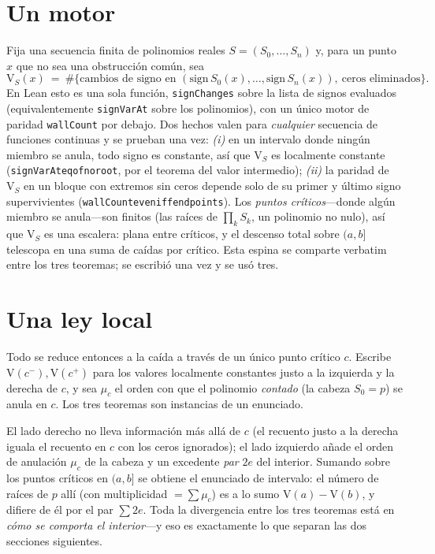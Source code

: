\documentclass[11pt]{article}
\newcommand{\lean}[1]{{\def\_{\textunderscore\allowbreak}\texttt{#1}}}
\newcommand{\V}{\mathrm{V}}
\newcommand{\keyeq}[1]{\begin{center}\keybox{$\displaystyle #1$}\end{center}}
\begin{document}
\section{Un motor}\label{sec:engine}

Fija una secuencia finita de polinomios reales $S=(S_0,\dots,S_n)$ y, para un punto $x$ que no sea una
obstrucci\'on com\'un, sea
\[
  \V_S(x)\ =\ \#\{\text{cambios de signo en } (\mathrm{sign}\,S_0(x),\dots,\mathrm{sign}\,S_n(x)),\ \text{ceros eliminados}\}.
\]
En Lean esto es una sola funci\'on, \lean{signChanges} sobre la lista de signos evaluados (equivalentemente
\lean{signVarAt} sobre los polinomios), con un \'unico motor de paridad \lean{wallCount} por debajo. Dos
hechos valen para \emph{cualquier} secuencia de funciones continuas y se prueban una vez: \emph{(i)} en un
intervalo donde ning\'un miembro se anula, todo signo es constante, as\'i que $\V_S$ es localmente constante
(\lean{signVarAt\_eq\_of\_no\_root}, por el teorema del valor intermedio); \emph{(ii)} la paridad de $\V_S$
en un bloque con extremos sin ceros depende solo de su primer y \'ultimo signo supervivientes
(\lean{wallCount\_even\_iff\_endpoints}). Los \emph{puntos cr\'iticos}---donde alg\'un miembro se anula---son
finitos (las ra\'ices de $\prod_k S_k$, un polinomio no nulo), as\'i que $\V_S$ es una escalera: plana entre
cr\'iticos, y el descenso total sobre $(a,b]$ telescopa en una suma de ca\'idas por cr\'itico. Esta espina
se comparte verbatim entre los tres teoremas; se escribi\'o una vez y se us\'o tres.

\section{Una ley local}\label{sec:law}

Todo se reduce entonces a la ca\'ida a trav\'es de un \'unico punto cr\'itico $c$. Escribe
$\V(c^-),\V(c^+)$ para los valores localmente constantes justo a la izquierda y la derecha de $c$, y sea
$\mu_c$ el orden con que el polinomio \emph{contado} (la cabeza $S_0=p$) se anula en $c$. Los tres teoremas
son instancias de un enunciado.
\keyeq{\V(c^-)\ =\ \V(c^+)\ +\ \mu_c\ +\ 2e\qquad(\exists\,e\in\mathbb{N}).}
El lado derecho no lleva informaci\'on m\'as all\'a de $c$ (el recuento justo a la derecha iguala el
recuento en $c$ con los ceros ignorados); el lado izquierdo a\~nade el orden de anulaci\'on $\mu_c$ de la
cabeza y un excedente \emph{par} $2e$ del interior. Sumando sobre los puntos cr\'iticos en $(a,b]$ se obtiene
el enunciado de intervalo: el n\'umero de ra\'ices de $p$ all\'i (con multiplicidad $=\sum\mu_c$) es a lo sumo
$\V(a)-\V(b)$, y difiere de \'el por el par $\sum 2e$. Toda la divergencia entre los tres teoremas est\'a en
\emph{c\'omo se comporta el interior}---y eso es exactamente lo que separan las dos secciones siguientes.
\end{document}

